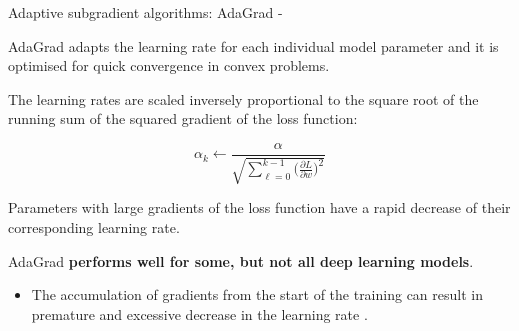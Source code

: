 


\begin{frame}[t,allowframebreaks]{
    Adaptive subgradient algorithms: AdaGrad -}

    \gls{AdaGrad} \cite{Duchi:11a} adapts the 
    \gls{learning rate} 
    for each individual model parameter
    and it is optimised for quick convergence in convex problems.\\
    \vspace{0.2cm}

    The \glspl{learning rate} are scaled inversely proportional to 
    the square root of the running sum of 
    the squared \gls{gradient} 
    of the \gls{loss function}:

    \begin{equation}
          \displaystyle
          \alpha_k \leftarrow 
          \frac{\alpha}
          {\sqrt{\sum_{\ell=0}^{k-1} 
            \Big(\frac{\partial L}{\partial w}\Big)^2}}
        \label{eq:adagrad_rate_update_rule}
    \end{equation}

    Parameters with large \glspl{gradient} 
    of the \gls{loss function} have a rapid decrease of their
    corresponding \gls{learning rate}.\\

    \vspace{0.2cm}

    \gls{AdaGrad} {\bf performs well for some, 
    but not all deep learning models}.
    \begin{itemize}
        \item
        The accumulation of \glspl{gradient} from the start 
        of the training can result in premature and excessive decrease
        in the \gls{learning rate} \cite{Goodfellow:2017MITDL}.
    \end{itemize}

\end{frame}